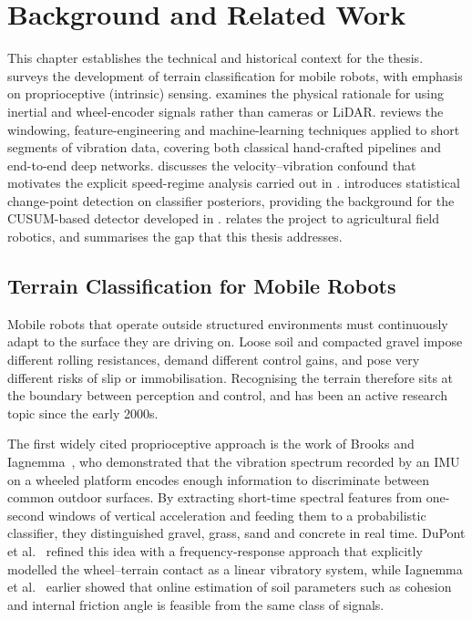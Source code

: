 \chapter{Background and Related Work}
\label{ch:background}

This chapter establishes the technical and historical context for the
thesis.  surveys the development of terrain classification for mobile robots, with emphasis on proprioceptive (intrinsic) sensing.  examines the physical rationale for using inertial and wheel-encoder signals rather than cameras or LiDAR.  reviews the windowing, feature-engineering and machine-learning techniques applied to short segments of vibration data, covering both classical hand-crafted pipelines and end-to-end deep networks.  discusses the velocity--vibration confound that motivates the explicit speed-regime analysis carried out in .  introduces statistical change-point detection on classifier posteriors, providing the background for the CUSUM-based detector developed in .  relates the project to agricultural field robotics, and  summarises the gap that this thesis addresses.

\section{Terrain Classification for Mobile Robots}
\label{sec:bg-history}

Mobile robots that operate outside structured environments must continuously adapt to the surface they are driving on. Loose soil and compacted gravel impose different rolling resistances, demand different control gains, and pose very different risks of slip or immobilisation. Recognising the terrain therefore sits at the boundary between perception and control, and has been an active research topic since the early 2000s.

The first widely cited proprioceptive approach is the work of Brooks and Iagnemma~\cite{Brooks2005}, who demonstrated that the vibration spectrum recorded by an IMU on a wheeled platform encodes enough information to discriminate between common outdoor surfaces. By extracting short-time spectral features from one-second windows of vertical acceleration and feeding them to a probabilistic classifier, they distinguished gravel, grass, sand and concrete in real time. DuPont et al.~\cite{DuPont2008} refined this idea with a frequency-response approach that explicitly modelled the wheel--terrain contact as a linear vibratory system, while Iagnemma et al.~\cite{Iagnemma2004} earlier showed that online estimation of soil parameters such as cohesion and internal friction angle is feasible from the same class of signals.


